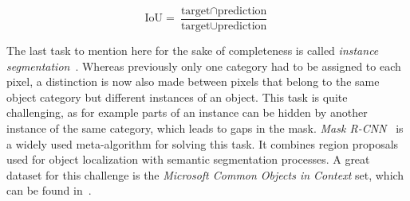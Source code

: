 \begin{equation}
    \label{eq:iou}
    \text{IoU} = \frac{\text{target} \cap \text{prediction}}{\text{target} \cup \text{prediction}}
\end{equation}

The last task to mention here for the sake of completeness is called \emph{instance segmentation}~\cite{mask-rcnn14}. Whereas previously only one category had to be assigned to each pixel, a distinction is now also made between pixels that belong to the same object category but different instances of an object. This task is quite challenging, as for example parts of an instance can be hidden by another instance of the same category, which leads to gaps in the mask. \emph{Mask R-CNN}~\cite{mask-rcnn14} is a widely used meta-algorithm for solving this task. It combines region proposals used for object localization with semantic segmentation processes. A great dataset for this challenge is the \emph{Microsoft Common Objects in Context} set, which can be found in~\cite{coco15}.

